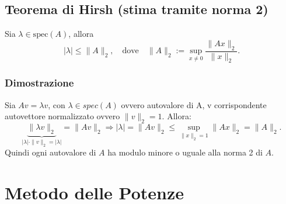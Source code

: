 \documentclass[12pt,a4paper]{article}
\begin{document}
\subsection*{Teorema di Hirsh (stima tramite norma 2)}
Sia \( \lambda \in \mathrm{spec}(A) \), allora
\[
|\lambda| \leq \|A\|_2, \quad \text{dove} \quad \|A\|_2 := \sup_{x \neq 0} \frac{\|Ax\|_2}{\|x\|_2}.
\]

\subsubsection*{Dimostrazione}
Sia \( A v = \lambda v \), con $\lambda\in spec(A)$ ovvero autovalore di A, v corrispondente autovettore normalizzato ovvero \( \|v\|_2 = 1 \). Allora:
\[ \underbrace{\|\lambda v\|_2}_{|\lambda|\cdot\|v\|_2=|\lambda|} = \|A v\|_2\Rightarrow
|\lambda| = \|A v\|_2 \leq \sup_{\|x\|_2 = 1} \|A x\|_2 = \|A\|_2.
\]
Quindi ogni autovalore di \( A \) ha modulo minore o uguale alla norma 2 di \( A \).


\section*{Metodo delle Potenze}

\begin{flushleft}
\end{flushleft}
\end{document}
